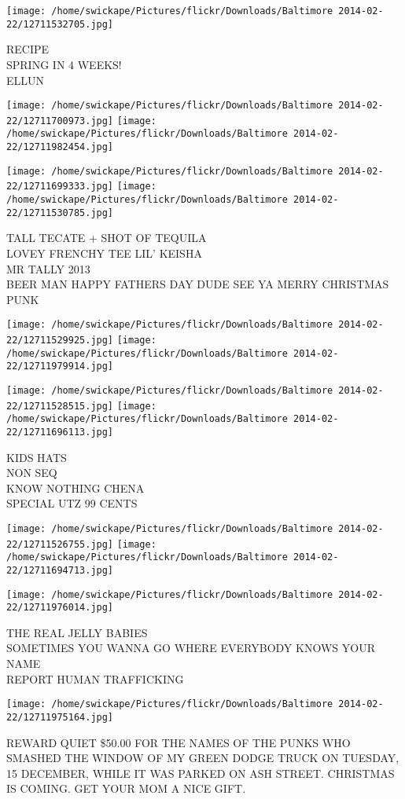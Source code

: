 \documentclass[10pt,letterpaper]{article}
\begin{document}
\vspace{0.25in}
\texttt{[image: /home/swickape/Pictures/flickr/Downloads/Baltimore 2014-02-22/12711532705.jpg]}

RECIPE\\
SPRING IN 4 WEEKS!\\
ELLUN
\pagebreak

\texttt{[image: /home/swickape/Pictures/flickr/Downloads/Baltimore 2014-02-22/12711700973.jpg]}
\texttt{[image: /home/swickape/Pictures/flickr/Downloads/Baltimore 2014-02-22/12711982454.jpg]}

\texttt{[image: /home/swickape/Pictures/flickr/Downloads/Baltimore 2014-02-22/12711699333.jpg]}
\texttt{[image: /home/swickape/Pictures/flickr/Downloads/Baltimore 2014-02-22/12711530785.jpg]}

TALL TECATE + SHOT OF TEQUILA\\
LOVEY FRENCHY TEE LIL' KEISHA\\
MR TALLY 2013\\
BEER MAN HAPPY FATHERS DAY DUDE SEE YA MERRY CHRISTMAS PUNK
\pagebreak

\texttt{[image: /home/swickape/Pictures/flickr/Downloads/Baltimore 2014-02-22/12711529925.jpg]}
\texttt{[image: /home/swickape/Pictures/flickr/Downloads/Baltimore 2014-02-22/12711979914.jpg]}

\texttt{[image: /home/swickape/Pictures/flickr/Downloads/Baltimore 2014-02-22/12711528515.jpg]}
\texttt{[image: /home/swickape/Pictures/flickr/Downloads/Baltimore 2014-02-22/12711696113.jpg]}

KIDS HATS\\
NON SEQ\\
KNOW NOTHING CHENA\\
SPECIAL UTZ 99 CENTS
\pagebreak

\texttt{[image: /home/swickape/Pictures/flickr/Downloads/Baltimore 2014-02-22/12711526755.jpg]}
\texttt{[image: /home/swickape/Pictures/flickr/Downloads/Baltimore 2014-02-22/12711694713.jpg]}

\vspace{0.25in}
\texttt{[image: /home/swickape/Pictures/flickr/Downloads/Baltimore 2014-02-22/12711976014.jpg]}

THE REAL JELLY BABIES\\
SOMETIMES YOU WANNA GO WHERE EVERYBODY KNOWS YOUR NAME\\
REPORT HUMAN TRAFFICKING
\pagebreak

\texttt{[image: /home/swickape/Pictures/flickr/Downloads/Baltimore 2014-02-22/12711975164.jpg]}

REWARD QUIET \$50.00 FOR THE NAMES OF THE PUNKS WHO SMASHED THE WINDOW OF MY GREEN DODGE TRUCK ON TUESDAY, 15 DECEMBER, WHILE IT WAS PARKED ON ASH STREET.  CHRISTMAS IS COMING.  GET YOUR MOM A NICE GIFT.
\pagebreak
\end{document}
